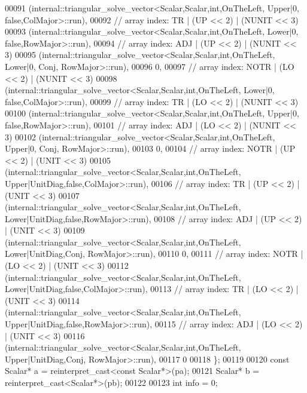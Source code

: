 \begin{DoxyCode}
00091     (internal::triangular\_solve\_vector<Scalar,Scalar,int,OnTheLeft, Upper|0,       false,ColMajor>::run),
00092     \textcolor{comment}{// array index: TR    | (UP << 2) | (NUNIT << 3)}
00093     (internal::triangular\_solve\_vector<Scalar,Scalar,int,OnTheLeft, Lower|0,       false,RowMajor>::run),
00094     \textcolor{comment}{// array index: ADJ   | (UP << 2) | (NUNIT << 3)}
00095     (internal::triangular\_solve\_vector<Scalar,Scalar,int,OnTheLeft, Lower|0,       Conj, RowMajor>::run),
00096     0,
00097     \textcolor{comment}{// array index: NOTR  | (LO << 2) | (NUNIT << 3)}
00098     (internal::triangular\_solve\_vector<Scalar,Scalar,int,OnTheLeft, Lower|0,       false,ColMajor>::run),
00099     \textcolor{comment}{// array index: TR    | (LO << 2) | (NUNIT << 3)}
00100     (internal::triangular\_solve\_vector<Scalar,Scalar,int,OnTheLeft, Upper|0,       false,RowMajor>::run),
00101     \textcolor{comment}{// array index: ADJ   | (LO << 2) | (NUNIT << 3)}
00102     (internal::triangular\_solve\_vector<Scalar,Scalar,int,OnTheLeft, Upper|0,       Conj, RowMajor>::run),
00103     0,
00104     \textcolor{comment}{// array index: NOTR  | (UP << 2) | (UNIT  << 3)}
00105     (internal::triangular\_solve\_vector<Scalar,Scalar,int,OnTheLeft, Upper|UnitDiag,false,ColMajor>::run),
00106     \textcolor{comment}{// array index: TR    | (UP << 2) | (UNIT  << 3)}
00107     (internal::triangular\_solve\_vector<Scalar,Scalar,int,OnTheLeft, Lower|UnitDiag,false,RowMajor>::run),
00108     \textcolor{comment}{// array index: ADJ   | (UP << 2) | (UNIT  << 3)}
00109     (internal::triangular\_solve\_vector<Scalar,Scalar,int,OnTheLeft, Lower|UnitDiag,Conj, RowMajor>::run),
00110     0,
00111     \textcolor{comment}{// array index: NOTR  | (LO << 2) | (UNIT  << 3)}
00112     (internal::triangular\_solve\_vector<Scalar,Scalar,int,OnTheLeft, Lower|UnitDiag,false,ColMajor>::run),
00113     \textcolor{comment}{// array index: TR    | (LO << 2) | (UNIT  << 3)}
00114     (internal::triangular\_solve\_vector<Scalar,Scalar,int,OnTheLeft, Upper|UnitDiag,false,RowMajor>::run),
00115     \textcolor{comment}{// array index: ADJ   | (LO << 2) | (UNIT  << 3)}
00116     (internal::triangular\_solve\_vector<Scalar,Scalar,int,OnTheLeft, Upper|UnitDiag,Conj, RowMajor>::run),
00117     0
00118   \};
00119 
00120   \textcolor{keyword}{const} Scalar* a = \textcolor{keyword}{reinterpret\_cast<}\textcolor{keyword}{const }Scalar*\textcolor{keyword}{>}(pa);
00121   Scalar* b = \textcolor{keyword}{reinterpret\_cast<}Scalar*\textcolor{keyword}{>}(pb);
00122 
00123   \textcolor{keywordtype}{int} info = 0;

\end{DoxyCode}
